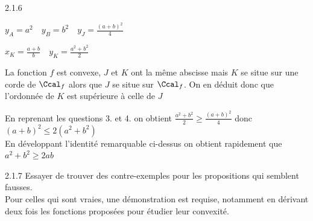 \begin{Solution}{2.1.6}
	\begin{enumerate}
	\begin{minipage}{0.5\linewidth}
		\item {}
    	\end{minipage}
    	\begin{minipage}{0.5\linewidth}
    	\item $y_A=a^2 \quad y_B=b^2 \quad y_J=\frac{(a+b)^2}{4}$\\
    	\item $x_K=\frac{a+b}{b} \quad y_K=\frac{a^2+b^2}{2}$\\
    	\item La fonction $f$ est convexe, $J$ et $K$ ont la même abscisse mais $K$ se situe sur une corde de $\Ccal_f$ alors que $J$ se situe sur $\Ccal_f$. On en déduit donc que l'ordonnée de $K$ est supérieure à celle de $J$\\
    	\item En reprenant les questions 3. et 4. on obtient $\frac{a^2+b^2}{2}\geq\frac{(a+b)^2}{4}$ donc $(a+b)^2\leq2(a^2+b^2)$\\
    	En développant l'identité remarquable ci-dessus on obtient rapidement que $a^2+b^2\geq2ab$
    	\end{minipage}
	\end{enumerate}
\end{Solution}
\begin{Indication}{2.1.7}
Essayer de trouver des contre-exemples pour les propositions qui semblent fausses.\\
Pour celles qui sont vraies,  une démonstration est requise, notamment en dérivant deux fois les fonctions proposées pour étudier leur convexité.
\end{Indication}
